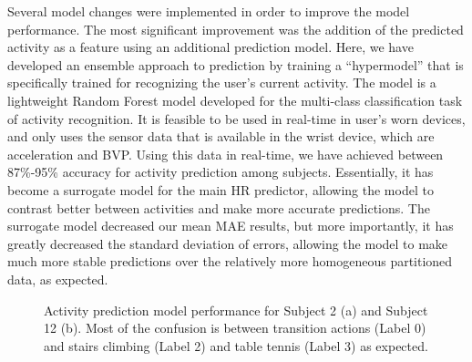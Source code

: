 \documentclass[12pt, conference]{IEEEtran}
\begin{document}
Several model changes were implemented in order to improve the model performance. The most significant improvement was the addition of the predicted activity as a feature using an additional prediction model. Here, we have developed an ensemble approach to prediction by training a “hypermodel” that is specifically trained for recognizing the user’s current activity. The model is a lightweight Random Forest model developed for the multi-class classification task of activity recognition. It is feasible to be used in real-time in user’s worn devices, and only uses the sensor data that is available in the wrist device, which are acceleration and BVP. Using this data in real-time, we have achieved between 87\%-95\% accuracy for activity prediction among subjects. Essentially, it has become a surrogate model for the main HR predictor, allowing the model to contrast better between activities and make more accurate predictions. The surrogate model decreased our mean MAE results, but more importantly, it has greatly decreased the standard deviation of errors, allowing the model to make much more stable predictions over the relatively more homogeneous partitioned data, as expected.

\begin{figure}[!t]
\centering
{}
\hfil
{}
\caption{Activity prediction model performance for Subject 2 (a) and Subject 12 (b). Most of the confusion is  between transition actions (Label 0) and stairs climbing (Label 2) and table tennis (Label 3) as expected.}
\label{fig_4}
\end{figure}
\end{document}
